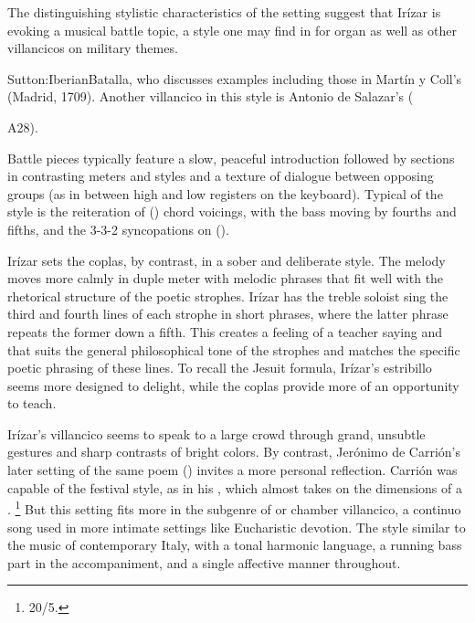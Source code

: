 The distinguishing stylistic characteristics of the setting suggest that Irízar is evoking a musical battle topic, a style one may find in  for organ as well as other villancicos on military themes.%
\begin{Footnote}
    \Autocite[]{Grove}{Sutton:IberianBatalla}, who discusses examples including those in Martín y Coll's  (Madrid, 1709).
    Another villancico in this style is Antonio de Salazar's  (\signature{MEX-Mc}{A28}).
\end{Footnote}
Battle pieces typically feature a slow, peaceful introduction followed by sections in contrasting meters and styles and a texture of dialogue between opposing groups (as in between high and low registers on the keyboard). 
Typical of the style is the reiteration of  () chord voicings, with the bass moving by fourths and fifths, and the 3-3-2 syncopations on  ().

Irízar sets the coplas, by contrast, in a sober and deliberate style.
The melody moves more calmly in duple meter with melodic phrases that fit well with the rhetorical structure of the poetic strophes.
Irízar has the treble soloist sing the third and fourth lines of each strophe in short phrases, where the latter phrase repeats the former down a fifth.
This creates a feeling of a teacher saying  and  that suits the general philosophical tone of the strophes and matches the specific poetic phrasing of these lines.
To recall the Jesuit formula, Irízar's estribillo seems more designed to delight, while the coplas provide more of an opportunity to teach.

Irízar's villancico seems to speak to a large crowd through grand, unsubtle gestures and sharp contrasts of bright colors.
By contrast, Jerónimo de Carrión's later setting of the same poem () invites a more personal reflection.%
    \Autocite{Cashner:SingingAboutSingingI}
Carrión was capable of the festival style, as in his , which almost takes on the dimensions of a .%
    \footnote{\signature{E-SE}{20/5}.}
But this setting fits more in the subgenre of  or chamber villancico, a continuo song used in more intimate settings like Eucharistic devotion.%
    \Autocite[See, for example,][]{Robledo:MadridTonos}
The style similar to the  music of contemporary Italy, with a tonal harmonic language, a running bass part in the accompaniment, and a single affective manner throughout.

